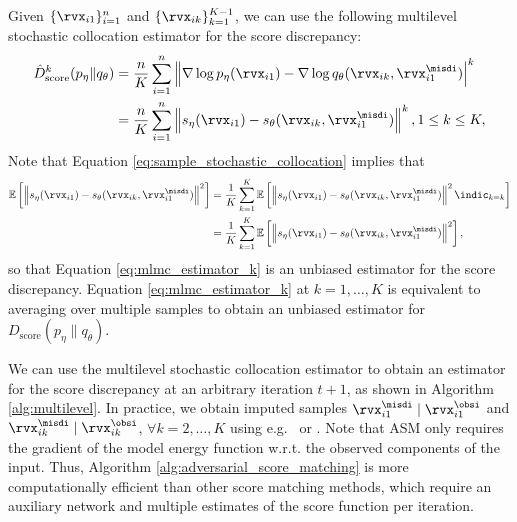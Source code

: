 Given $\{\rvx_{i1}\}_{i=1}^{n}$ and $\{\rvx_{ik}\}_{k=1}^{K-1}$, we can use the following multilevel stochastic collocation estimator for the score discrepancy:
\begin{align}
	\hat{D}_{\text{\rm{score}}}^{k}(p_{\eta} \| q_{\theta}) &= \frac{n}{K} \sum_{i=1}^{n} \left\| \nabla \log p_{\eta}(\rvx_{i1}) - \nabla \log q_{\theta}(\rvx_{ik}, \rvx_{i1}^{\misdi}) \right|^{k} \label{eq:mlmc_estimator_k} \\
    & = \frac{n}{K} \sum_{i=1}^{n} \left\| s_{\eta}(\rvx_{i1}) - s_{\theta}(\rvx_{ik}, \rvx_{i1}^{\misdi}) \right\|^{k}, 1 \leq k \leq K, \notag
\end{align}
Note that Equation \eqref{eq:sample_stochastic_collocation} implies that 
\begin{align*}
	\mathbb{E} \left[ \left\| s_{\eta}(\rvx_{i1}) - s_{\theta}(\rvx_{ik}, \rvx_{i1}^{\misdi}) \right\|^{2}\right] & = \frac{1}{K} \sum_{k=1}^{K} \mathbb{E} \left[ \left\| s_{\eta}(\rvx_{i1}) - s_{\theta}(\rvx_{ik}, \rvx_{i1}^{\misdi}) \right\|^{2} \indic_{k=k} \right] \\ 
	& = \frac{1}{K} \sum_{k=1}^{K} \mathbb{E} \left[ \left\| s_{\eta}(\rvx_{i1}) - s_{\theta}(\rvx_{ik}, \rvx_{i1}^{\misdi}) \right\|^{2} \right],
\end{align*}
so that Equation \eqref{eq:mlmc_estimator_k} is an unbiased estimator for the score discrepancy.
Equation \eqref{eq:mlmc_estimator_k} at $k=1, \ldots, K$ is equivalent to averaging over multiple samples to obtain an unbiased estimator for $D_{\text{score}}(p_{\eta} \| q_{\theta})$.

We can use the multilevel stochastic collocation estimator to obtain an estimator for the score discrepancy at an arbitrary iteration $t+1$, as shown in Algorithm \ref{alg:multilevel}. In practice, we obtain imputed samples $\rvx_{i1}^{\misdi} \mid \rvx_{i1}^{\obsi}$ and $\rvx_{ik}^{\misdi} \mid \rvx_{ik}^{\obsi}$, $\forall k=2,\ldots,K$ using e.g.\ \citet{Ho2020} or \citet{Song2019}. Note that ASM only requires the gradient of the model energy function w.r.t. the observed components of the input. Thus, Algorithm \ref{alg:adversarial_score_matching} is more computationally efficient than other score matching methods, which require an auxiliary network and multiple estimates of the score function per iteration.

